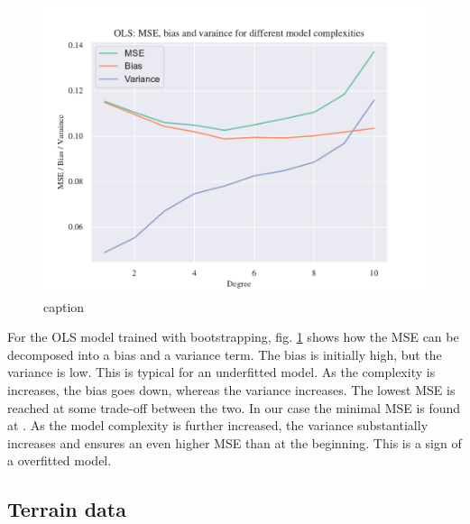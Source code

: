 \begin{figure}[h!]
    \centering
    \includegraphics[width=1\linewidth]{project_1_alt/figures/figures_in_report/bias_var_Franke_Noise_bootstrap.pdf}
    \caption{caption}
    \label{bias_var_trade}
\end{figure}

For the OLS model trained with bootstrapping, fig. \ref{bias_var_trade} shows how the MSE can be decomposed into a bias and a variance term. The bias is initially high, but the variance is low. This is typical for an underfitted model. As the complexity is increases, the bias goes down, whereas the variance increases. The lowest MSE is reached at some trade-off between the two. In our case the minimal MSE is found at . As the model complexity is further increased, the variance substantially increases and ensures an even higher MSE than at the beginning. This is a sign of a overfitted model.

\subsection{Terrain data}



